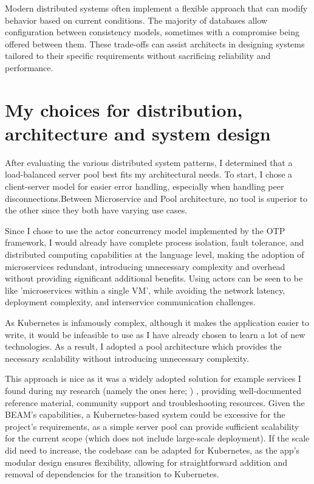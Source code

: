 \documentclass[]{final}
\begin{document}
Modern distributed systems often implement a flexible approach that can modify
behavior based on current conditions. The majority of databases allow
configuration between consistency models, sometimes with a compromise being
offered between them. These trade-offs can assist architects in designing
systems tailored to their specific requirements without sacrificing
reliability and performance.

\section{My choices for distribution, architecture and system design}

After evaluating the various distributed system patterns,
I determined that a load-balanced server pool best fits my architectural
needs. To start, I chose a client-server model for easier error handling,
especially when handling peer disconnections.Between Microservice and Pool
architecture, no tool is superior to the other
since they both have varying use cases.%

Since I chose to use the actor concurrency model implemented by the OTP
framework, I would already have complete process isolation, fault tolerance,
and distributed computing capabilities at the language level, making
the adoption of microservices redundant, introducing unnecessary complexity
and overhead without providing significant additional benefits.
Using actors can be seen to be like 'microservices within a single VM', while
avoiding the network latency, deployment complexity, and interservice
communication challenges.

As Kubernetes is infamously complex, although it makes the application easier
to write, it would be infeasible to use as I have already chosen to learn a
lot of new technologies. As a result, I adopted a pool architecture which
provides the necessary scalability without introducing unnecessary complexity.

This approach is nice as it was a widely adopted solution for example
services I found during my research (namely the ones here; %
)%
, providing
well-documented reference material, community support and troubleshooting
resources.
Given the BEAM's capabilities, a Kubernetes-based system could be excessive
for the project’s requirements, as a simple server pool can provide
sufficient scalability for the current scope (which does not include
large-scale deployment). If the scale did need to increase, the
codebase can be adapted for Kubernetes, as the app’s modular design
ensures flexibility, allowing for straightforward addition and removal of
dependencies for the transition to Kubernetes.
\end{document}
